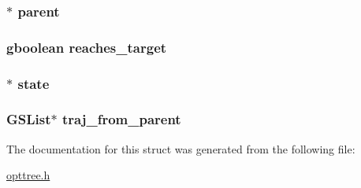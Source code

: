 \hypertarget{a00003_a3d511232fc93632bb149b5932f215a4f_a3d511232fc93632bb149b5932f215a4f}{
\subsubsection[{parent}]{$\ast$ {\bf parent}}}\label{d1/d7c/a00003_a3d511232fc93632bb149b5932f215a4f_a3d511232fc93632bb149b5932f215a4f}
\hypertarget{a00003_a777bee52ae854bd4b84bddfc8ab97ede_a777bee52ae854bd4b84bddfc8ab97ede}{
\subsubsection[{reaches\-\_\-target}]{\setlength{\rightskip}{0pt plus 5cm}gboolean {\bf reaches\-\_\-target}}}\label{d1/d7c/a00003_a777bee52ae854bd4b84bddfc8ab97ede_a777bee52ae854bd4b84bddfc8ab97ede}
\hypertarget{a00003_ad180be797ec209ed2712c000b4fd536f_ad180be797ec209ed2712c000b4fd536f}{
\subsubsection[{state}]{$\ast$ {\bf state}}}\label{d1/d7c/a00003_ad180be797ec209ed2712c000b4fd536f_ad180be797ec209ed2712c000b4fd536f}
\hypertarget{a00003_a5e2ba085667b237c00e4c754c829e9e9_a5e2ba085667b237c00e4c754c829e9e9}{
\subsubsection[{traj\-\_\-from\-\_\-parent}]{\setlength{\rightskip}{0pt plus 5cm}\-G\-S\-List$\ast$ {\bf traj\-\_\-from\-\_\-parent}}}\label{d1/d7c/a00003_a5e2ba085667b237c00e4c754c829e9e9_a5e2ba085667b237c00e4c754c829e9e9}


\-The documentation for this struct was generated from the following file\-:\begin{DoxyCompactItemize}
\item 
\hyperlink{a00020}{opttree.\-h}\end{DoxyCompactItemize}
